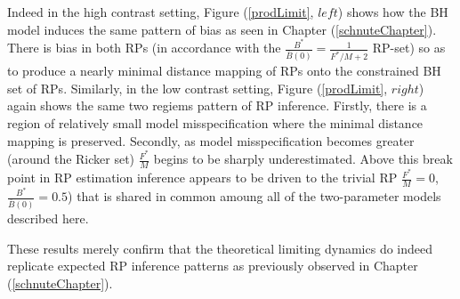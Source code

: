 Indeed in the high contrast setting, Figure (\ref{prodLimit}, $left$) shows 
how the BH model induces the same pattern of bias as seen in Chapter 
(\ref{schnuteChapter}). There is bias in both RPs (in accordance with the 
$\frac{B^*}{\bar B(0)}=\frac{1}{F^*/M+2}$ RP-set) so as to produce a nearly 
minimal distance mapping of RPs onto the constrained BH set of RPs. 
Similarly, in the low contrast setting, Figure (\ref{prodLimit}, $right$) again 
shows the same two regiems pattern of RP inference. Firstly, there is a region of 
relatively small model misspecification where the minimal distance mapping 
is preserved. Secondly, as model misspecification becomes greater (around the 
Ricker set) $\frac{F^*}{M}$ begins to be sharply underestimated. Above this 
break point in RP estimation inference appears to be driven to the trivial RP 
$\frac{F^*}{M}=0$, $\frac{B^*}{\bar B(0)}=0.5$) that is shared in common 
amoung all of the two-parameter models described here.

%
These results merely confirm that the theoretical limiting dynamics do indeed 
replicate expected RP inference patterns as previously observed in Chapter (\ref{schnuteChapter}).
    
%
%
%
%


